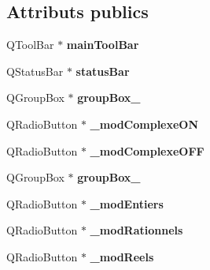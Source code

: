 \subsection*{Attributs publics}
\begin{DoxyCompactItemize}
\item 
\hypertarget{class_ui___widget_a5ca3416e2d3b45799260113206bce5d2}{Q\-Tool\-Bar $\ast$ {\bfseries main\-Tool\-Bar}}\label{class_ui___widget_a5ca3416e2d3b45799260113206bce5d2}

\item 
\hypertarget{class_ui___widget_a0616d9c4a5af2cb76046e822a7fcfc9a}{Q\-Status\-Bar $\ast$ {\bfseries status\-Bar}}\label{class_ui___widget_a0616d9c4a5af2cb76046e822a7fcfc9a}

\item 
\hypertarget{class_ui___widget_a0562d1871ab799c677b56f36f345c6dd}{Q\-Group\-Box $\ast$ {\bfseries group\-Box\-\_}}\label{class_ui___widget_a0562d1871ab799c677b56f36f345c6dd}

\item 
\hypertarget{class_ui___widget_a39cbbadb241d2b4af7b8f912a591b481}{Q\-Radio\-Button $\ast$ {\bfseries \-\_\-mod\-Complexe\-O\-N}}\label{class_ui___widget_a39cbbadb241d2b4af7b8f912a591b481}

\item 
\hypertarget{class_ui___widget_a249b531b400ff8efa687037f75d8d7c0}{Q\-Radio\-Button $\ast$ {\bfseries \-\_\-mod\-Complexe\-O\-F\-F}}\label{class_ui___widget_a249b531b400ff8efa687037f75d8d7c0}

\item 
\hypertarget{class_ui___widget_ac164b5fb7882f7943de7a8e441487a61}{Q\-Group\-Box $\ast$ {\bfseries group\-Box\-\_}}\label{class_ui___widget_ac164b5fb7882f7943de7a8e441487a61}

\item 
\hypertarget{class_ui___widget_a840a8431d2528e6237f563a8b69efd33}{Q\-Radio\-Button $\ast$ {\bfseries \-\_\-mod\-Entiers}}\label{class_ui___widget_a840a8431d2528e6237f563a8b69efd33}

\item 
\hypertarget{class_ui___widget_a56279ab34310f87e7846fc03f45f4499}{Q\-Radio\-Button $\ast$ {\bfseries \-\_\-mod\-Rationnels}}\label{class_ui___widget_a56279ab34310f87e7846fc03f45f4499}

\item 
\hypertarget{class_ui___widget_ade3f0e823929ba818460a8c5fb4b153c}{Q\-Radio\-Button $\ast$ {\bfseries \-\_\-mod\-Reels}}\label{class_ui___widget_ade3f0e823929ba818460a8c5fb4b153c}


\end{DoxyCompactItemize}
